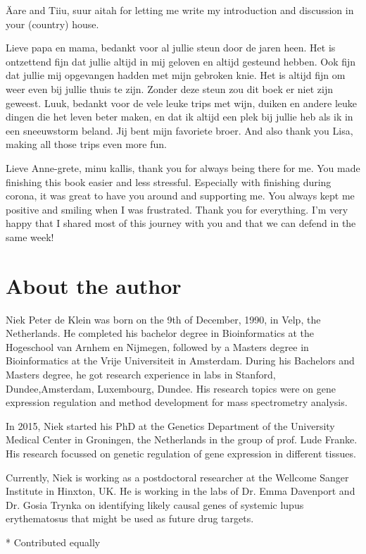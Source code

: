 \begin{appendices}
\"Aare and Tiiu, suur aitah for letting me write my introduction and discussion in your (country) house.

Lieve papa en mama, bedankt voor al jullie steun door de jaren heen. Het is ontzettend fijn dat jullie altijd in mij geloven en altijd gesteund hebben. Ook fijn dat jullie mij opgevangen hadden met mijn gebroken knie. Het is altijd fijn om weer even bij jullie thuis te zijn. Zonder deze steun zou dit boek er niet zijn geweest. Luuk, bedankt voor de vele leuke trips met wijn, duiken en andere leuke dingen die het leven beter maken, en dat ik altijd een plek bij jullie heb als ik in een sneeuwstorm beland. Jij bent mijn favoriete broer. And also thank you Lisa, making all those trips even more fun. 

Lieve Anne-grete, minu kallis, thank you for always being there for me. You made finishing this book easier and less stressful. Especially with finishing during corona, it was great to have you around and supporting me. You always kept me positive and smiling when I was frustrated. Thank you for everything. I'm very happy that I shared most of this journey with you and that we can defend in the same week!

\chapter{About the author}

Niek Peter de Klein was born on the 9th of December, 1990, in Velp, the Netherlands. He completed his bachelor degree in Bioinformatics at the Hogeschool van Arnhem en Nijmegen, followed by a Masters degree in Bioinformatics at the Vrije Universiteit in Amsterdam. During his Bachelors and Masters degree, he got research experience in labs in Stanford, Dundee,Amsterdam, Luxembourg, Dundee. His research topics were on gene expression regulation and method development for mass spectrometry analysis.  

In 2015, Niek started his PhD at the Genetics Department of the University Medical Center in Groningen, the Netherlands in the group of prof. Lude Franke. His research focussed on genetic regulation of gene expression in different tissues. 


Currently, Niek is working as a postdoctoral researcher at the Wellcome Sanger Institute in Hinxton, UK. He is working in the labs of Dr. Emma Davenport and Dr. Gosia Trynka on identifying likely causal genes of systemic lupus erythematosus that might be used as future drug targets.



\renewcommand{\bibsection}{\section*{List of Publications}}
\nocite{*}




* Contributed equally

\end{appendices}
